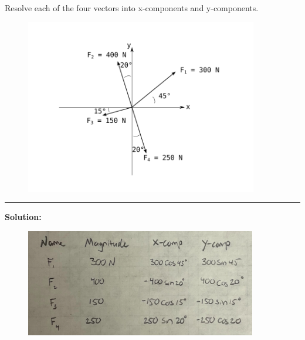 
Resolve each of the four vectors into x-components and y-components.

\begin{figure}[ht!]
  \centering
  \includegraphics[height=3in]{fig.png}
\end{figure}

\vspace{.5cm}
\rule{\textwidth}{.4pt}
\vspace{.5cm}
\textbf{Solution:}
\begin{figure}[ht!]
  \centering
  \includegraphics[width=0.9\textwidth]{soln.png}
\end{figure}


